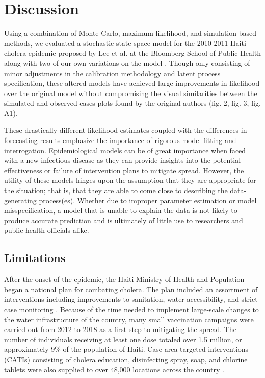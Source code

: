 \documentclass[12pt]{article}
\begin{document}
\section{Discussion}

  Using a combination of Monte Carlo, maximum likelihood, and simulation-based methods, we evaluated a stochastic state-space model for the 2010-2011 Haiti cholera epidemic proposed by Lee et al. at the Bloomberg School of Public Health along with two of our own variations on the model \cite{Lee_haiticholera}. Though only consisting of minor adjustments in the calibration methodology and latent process specification, these altered models have achieved large improvements in likelihood over the original model without compromising the visual similarities between the simulated and observed cases plots found by the original authors (fig. 2, fig. 3, fig. A1).

  These drastically different likelihood estimates coupled with the differences in forecasting results emphasize the importance of rigorous model fitting and interrogation. Epidemiological models can be of great importance when faced with a new infectious disease as they can provide insights into the potential effectiveness or failure of intervention plans to mitigate spread. However, the utility of these models hinges upon the assumption that they are appropriate for the situation; that is, that they are able to come close to describing the data-generating process(es). Whether due to improper parameter estimation or model misspecification, a model that is unable to explain the data is not likely to produce accurate prediction and is ultimately of little use to researchers and public health officials alike.
   
\subsection{Limitations}

  After the onset of the epidemic, the Haiti Ministry of Health and Population began a national plan for combating cholera. The plan included an assortment of interventions including improvements to sanitation, water accessibility, and strict case monitoring \cite{tohme}. Because of the time needed to implement large-scale changes to the water infrastructure of the country, many small vaccination campaigns were carried out from 2012 to 2018 as a first step to mitigating the spread. The number of individuals receiving at least one dose totaled over 1.5 million, or approximately 9\% of the population of Haiti. Case-area targeted interventions (CATIs) consisting of cholera education, disinfecting spray, soap, and chlorine tablets were also supplied to over 48,000 locations across the country \cite{Rebaudet}.
  
\end{document}
